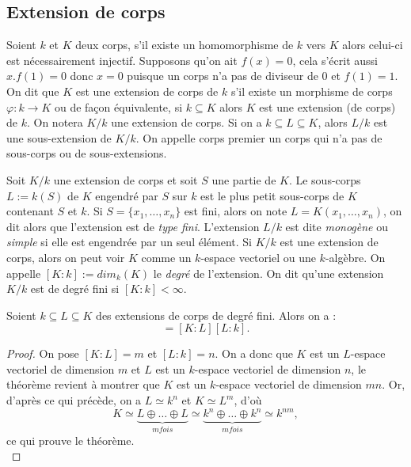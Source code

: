 \documentclass[a4paper]{article} %
\numberwithin{section}{part}
\numberwithin{equation}{section}
\begin{document}
\subsection{Extension de corps}
\label{def:degext}
Soient $k$ et $K$ deux corps, s'il existe un homomorphisme de $k$ vers $K$ alors
celui-ci est nécessairement injectif. Supposons qu'on ait $f(x) = 0$, cela
s'écrit aussi $x.f(1) = 0$ donc $x = 0$ puisque un corps n'a pas de diviseur de
$0$ et $f(1) = 1$. 
On dit que $K$ est une extension de corps de $k$ s'il existe un morphisme de 
corps $\varphi : k \to K$ ou de façon équivalente, si $k \subseteq K$ alors $K$
est une extension (de corps) de $k$. On notera $K/k$ une extension de corps.
Si on a $k\subseteq L \subseteq K$, alors $L/k$ est une sous-extension de
$K/k$. On appelle corps premier un corps qui n'a pas de sous-corps ou de
sous-extensions.\par
Soit $K/k$ une extension de corps et soit $S$ une partie de $K$. Le sous-corps 
$L := k(S)$ de $K$ engendré par $S$ sur $k$ est le plus petit sous-corps de $K$ 
contenant $S$ et $k$. Si $S = \lbrace x_1,\dots,x_n \rbrace$ est fini, alors on 
note $L = K(x_1,\dots,x_n)$, on dit alors que l'extension est de \emph{type
fini}. L'extension $L/k$ est dite \emph{monogène} ou \emph{simple} si elle est
engendrée par un seul élément. Si $K/k$ est une extension de corps, alors on 
peut voir $K$ comme un $k$-espace vectoriel ou une $k$-algèbre. On appelle 
$[K:k] := dim_k(K)$ le \emph{degré} de l'extension. On dit qu'une extension 
$K/k$ est de degré fini si $[K:k] < \infty$.\par

\begin{thm}
Soient $k \subseteq L \subseteq K$ des extensions de corps de degré fini. Alors 
on a :
\begin{equation}
[K:k] = [K:L][L:k].
\end{equation}
\end{thm}
\begin{proof}
On pose $[K:L] = m$ et $[L:k] = n$. On a donc que $K$ est un $L$-espace 
vectoriel de dimension $m$ et $L$ est un $k$-espace vectoriel de dimension $n$, 
le théorème revient à montrer que $K$ est un $k$-espace vectoriel de dimension 
$mn$. Or, d'après ce qui précède, on a $L \simeq k^n$ et $K \simeq L^m$, d'où
\begin{equation}
K \simeq \underbrace{L \oplus\dots\oplus L}_{m fois}\simeq\underbrace
{k^n\oplus\dots\oplus k^n}_{m fois} \simeq k^{nm},
\end{equation}
ce qui prouve le théorème.\\
\end{proof}
\end{document}
